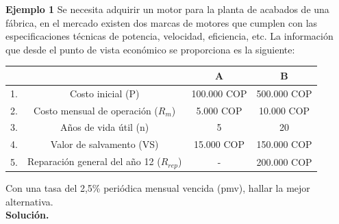 \textbf{Ejemplo 1}\newline
Se necesita adquirir un motor para la planta de acabados de una fábrica, en el mercado existen dos marcas de motores que cumplen con las especificaciones técnicas de potencia, velocidad, eficiencia, etc.
La información que desde el punto de vista económico se proporciona es la siguiente:\\
\begin{center}
		\begin{tabular}{|c|c|c|c|}
			
			\hline
			\rowcolor[HTML]{FFB183}
			  &                               & A       & B       \\ \hline
			1. & Costo inicial (P)                 & 100.000 COP & 500.000 COP \\ \hline
			2. & Costo mensual de operación ($R_m$)   & 5.000 COP   & 10.000 COP \\ \hline
			3. & Años de vida útil (n)            & 5       & 20      \\ \hline
			4. & Valor de salvamento (VS)           & 15.000 COP  & 150.000 COP \\ \hline
			5. & Reparación general del año 12 ($R_{rep}$) & -      & 200.000 COP \\ \hline
		\end{tabular}
  \hspace{1cm}
\end{center}

Con una tasa del 2,5\% periódica mensual vencida (pmv), hallar la mejor alternativa. \\

\textbf{Solución.}\\



